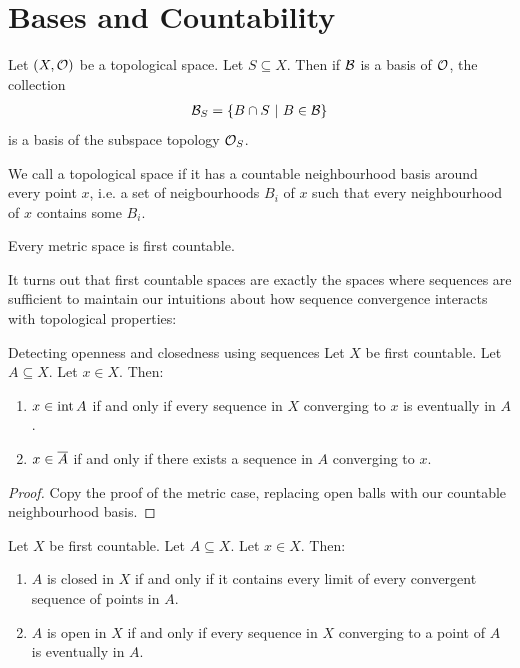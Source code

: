 \clearpage

\section{Bases and Countability}
\begin{exercise}
	Let $(X, \mathcal{O})$ be a topological space. Let $S \subseteq X$. Then if $\mathcal{B}$ is a basis of $\mathcal{O}$, the collection
	\begin{align*}
		\mathcal{B}_S = \qty{B \cap S ~\middle|~B \in \mathcal{B}}
	\end{align*}
	is a basis of the subspace topology $\mathcal{O}_S$.
\end{exercise}
\begin{importantdefinition}{}{}
	We call a topological space  if it has a countable neighbourhood basis around every point $x$, i.e. a set of neigbourhoods $B_i$ of $x$ such that every neighbourhood of $x$ contains some $B_i$.
\end{importantdefinition}
\begin{exercise}
	Every metric space is first countable.
\end{exercise}
It turns out that first countable spaces are exactly the spaces where sequences are sufficient to maintain our intuitions about how sequence convergence interacts with topological properties:
\begin{importanttheorem}{Detecting openness and closedness using sequences}{}
	Let $X$ be first countable. Let $A \subseteq X$. Let $x \in X$. Then:
	\begin{enumerate}
		\item $x \in \operatorname{int} A$ if and only if every sequence in $X$ converging to $x$ is eventually in $A$.
		\item $x \in \overline{{A}}$ if and only if there exists a sequence in $A$ converging to $x$.
	\end{enumerate}
\end{importanttheorem}
\begin{proof}
	Copy the proof of the metric case, replacing open balls with our countable neighbourhood basis.
\end{proof}
\begin{corollary}
	Let $X$ be first countable. Let $A \subseteq X$. Let $x \in X$. Then:
	\begin{enumerate}
		\item $A$ is closed in $X$ if and only if it contains every limit of every convergent sequence of points in $A$.
		\item $A$ is open in $X$ if and only if every sequence in $X$ converging to a point of $A$ is eventually in $A$.
	\end{enumerate}
\end{corollary}
